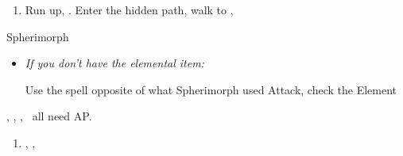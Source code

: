 \begin{enumerate}[resume]
    \item Run up, \sd. Enter the hidden path, walk to \auron, \sd
\end{enumerate}
\bothvfill\winvfill\lossvfill
\begin{battle}[12000]{Spherimorph}
    \begin{itemize}
        \tidusf Defend
        \switch{\tidus}{\yuna}
        \yunaf Defend
        \kimahrif Defend
        \switch{\auron}{\rikku}
        \rikkuf Grenade, check the Element
        \yunaf Defend
        \rikkuf \od, HP Sphere with
        \begin{itemize}
            \item Fire: Arctic Wind
            \item Ice: Bomb Core
            \item Water: Lightning Marble
            \item Thunder: Fish Scale
        \end{itemize}
        \item \textit{If you don't have the elemental item:}
        \begin{itemize}
            \switch{\rikku}{\lulu}
            \luluf Use the spell opposite of what Spherimorph used
            \kimahrif Attack, check the Element
            \switch{\yuna}{\rikku}
            \rikkuf \od
        \end{itemize}
    \end{itemize}
    \tidus, \yuna, \kimahri, \rikku\ all need AP.
\end{battle}
\begin{enumerate}[resume]
    \item \cs[1:50], \sd, \sd
\end{enumerate}
\colend
